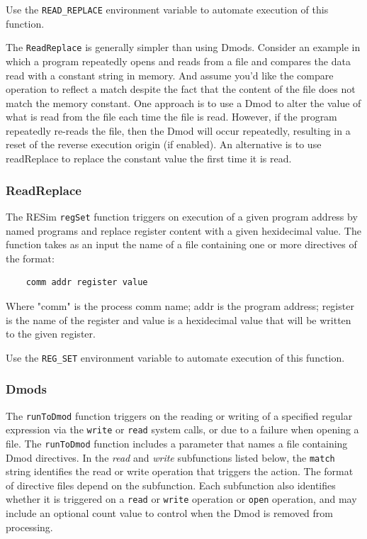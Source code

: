 \documentclass[titlepage]{article}
\begin{document}
Use the {\tt READ\_REPLACE} environment variable to automate execution of this function.

The {\tt ReadReplace} is generally simpler than using Dmods.  Consider an example in which a program
repeatedly opens and reads from a file and compares the data read with a constant string in memory.
And assume you'd like the compare operation to reflect a match despite the fact that the content of
the file does not match the memory constant.  One approach is to use a Dmod to alter the value of what
is read from the file each time the file is read.  However, if the program repeatedly re-reads the file,
then the Dmod will occur repeatedly, resulting in a reset of the reverse execution origin (if enabled).
An alternative is to use readReplace to replace the constant value the first time it is read.  

\subsubsection{ReadReplace}
\label{read-replace}
The RESim {\tt regSet} function triggers on execution of a given program address
by named programs and replace register content with a given hexidecimal value.  The function takes as an
input the name of a file containing one or more directives of the format:
\begin{verbatim}
    comm addr register value
\end{verbatim}
Where "comm" is the process comm name; addr is the program address; register is the
name of the register and value is a hexidecimal value that will be written to the given
register.

Use the {\tt REG\_SET} environment variable to automate execution of this function.

\subsubsection{Dmods}
The {\tt runToDmod} function triggers on the reading or writing of a specified
regular expression via the {\tt write} or {\tt read} system calls, or due to a failure
when opening a file.    
The {\tt runToDmod} function includes a parameter that names a file containing
Dmod directives.  In the \textit{read} and \textit{write} subfunctions listed
below, the {\tt match} string identifies the read or write operation that triggers the action. 
The format of directive files depend on the subfunction.  Each subfunction also identifies whether it is
triggered on a {\tt read} or {\tt write} operation or {\tt open} operation, and may include an optional count value to control when
the Dmod is removed from processing.
\end{document}
